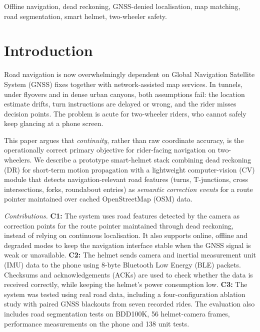\documentclass[conference]{IEEEtran}
\begin{document}
\begin{IEEEkeywords}
Offline navigation, dead reckoning, GNSS-denied localisation, map matching, road segmentation, smart helmet, two-wheeler safety.
\end{IEEEkeywords}

\section{Introduction}

Road navigation is now overwhelmingly dependent on Global Navigation Satellite System (GNSS) fixes together with network-assisted map services. In tunnels, under flyovers and in dense urban canyons, both assumptions fail: the location estimate drifts, turn instructions are delayed or wrong, and the rider misses decision points. The problem is acute for two-wheeler riders, who cannot safely keep glancing at a phone screen.

This paper argues that \emph{continuity}, rather than raw coordinate accuracy, is the operationally correct primary objective for rider-facing navigation on two-wheelers. We describe a prototype smart-helmet stack combining dead reckoning (DR) for short-term motion propagation with a lightweight computer-vision (CV) module that detects navigation-relevant road features (turns, T-junctions, cross intersections, forks, roundabout entries) as \emph{semantic correction events} for a route pointer maintained over cached OpenStreetMap (OSM) data.

\emph{Contributions.} \textbf{C1:} The system uses road features detected by the camera as correction points for the route pointer maintained through dead reckoning, instead of relying on continuous localisation. It also supports online, offline and degraded modes to keep the navigation interface stable when the GNSS signal is weak or unavailable. \textbf{C2:} The helmet sends camera and inertial measurement unit (IMU) data to the phone using 8-byte Bluetooth Low Energy (BLE) packets. Checksums and acknowledgements (ACKs) are used to check whether the data is received correctly, while keeping the helmet's power consumption low. \textbf{C3:} The system was tested using real road data, including a four-configuration ablation study with paired GNSS blackouts from seven recorded rides. The evaluation also includes road segmentation tests on BDD100K, 56 helmet-camera frames, performance measurements on the phone and 138 unit tests.
\end{document}
